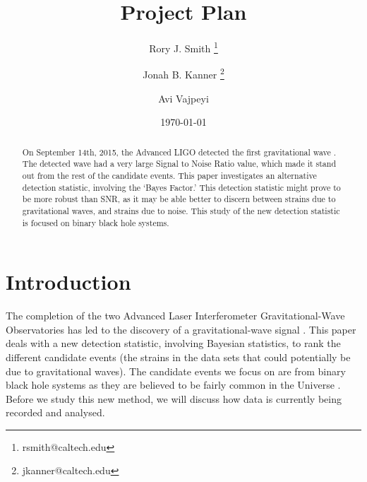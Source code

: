 \documentclass{article}
\title{Project Plan} %
\author[1]{Rory J. Smith \thanks{rsmith@caltech.edu}}
\author[1]{Jonah B. Kanner \thanks{jkanner@caltech.edu}}
\author[2]{Avi Vajpeyi }
\affil[1]{LIGO Laboratory, California Institute of Technology, Pasadena, CA 91125, USA}
\affil[2]{The College of Wooster, Wooster, OH 44691, USA}
\date{\today} %
\begin{document}
\maketitle %






 \begin{abstract}
On September 14th, 2015, the Advanced LIGO detected the first gravitational wave \cite{DetectionPaper}. The detected wave had a very large Signal to Noise Ratio value, which made it stand out from the rest of the candidate events. This paper investigates an alternative detection statistic, involving the `Bayes Factor.' This detection statistic might prove to be more robust than SNR, as it may be able better to discern between strains due to gravitational waves, and strains due to noise. This study of the new detection statistic is focused on binary black hole systems. 


\end{abstract}


\section{Introduction} \label{section:intro}




 \indent The completion of the two Advanced Laser Interferometer Gravitational-Wave Observatories has led to the discovery of a gravitational-wave signal \cite{DetectionPaper}. This paper deals with a new detection statistic, involving Bayesian statistics, to rank the different candidate events (the strains in the data sets that could potentially be due to gravitational waves). The candidate events we focus on are from binary black hole systems as they are believed to be fairly common in the Universe \cite{NumDetections}. Before we study this new method, we will discuss how data is currently being recorded and analysed.\\
 
\end{document}
